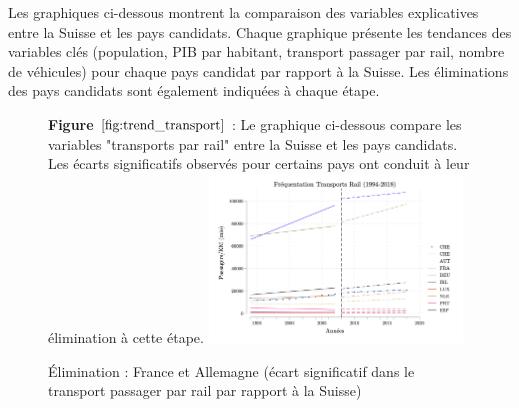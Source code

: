 Les graphiques ci-dessous montrent la comparaison des variables explicatives entre la Suisse et les pays candidats. Chaque graphique présente les tendances des variables clés (population, PIB par habitant, transport passager par rail, nombre de véhicules) pour chaque pays candidat par rapport à la Suisse. Les éliminations des pays candidats sont également indiquées à chaque étape.

\vspace{1cm}

        \begin{figure}[H]
\textbf{Figure {$\ref{fig:trend_transport}$}} : 
Le graphique ci-dessous compare les variables "transports par rail" entre la Suisse et les pays candidats. Les écarts significatifs observés pour certains pays ont conduit à leur élimination à cette étape.
        \centering
        \includegraphics[width=0.6\textwidth]{Article/images/trend_transport.png}
        \caption{}
        \label{fig:trend_transport}
\begin{center}
   Élimination : France et Allemagne (écart significatif dans le transport passager par rail par rapport à la Suisse) 
\end{center}
    \end{figure}




